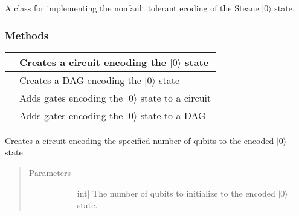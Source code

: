 \documentclass[letterpaper,10pt,english]{sphinxmanual}
\begin{document}

\begin{fulllineitems}
\label{\detokenize{Base:BaseFaultTolerance.Encoder}}
A class for implementing the non\sphinxhyphen{}fault tolerant ecoding of the Steane \(|0\rangle\) state.
\subsubsection*{Methods}


\begin{savenotes}\sphinxattablestart
\centering
\begin{tabulary}{\linewidth}[t]{|T|T|}
\hline

&
Creates a circuit encoding the \(|0\rangle\) state
\\
\hline
{}
&
Creates a DAG encoding the \(|0\rangle\) state
\\
\hline
{}
&
Adds gates encoding the \(|0\rangle\) state to a circuit
\\
\hline
{}
&
Adds gates encoding the \(|0\rangle\) state to a DAG
\\
\hline
\end{tabulary}
\par
\sphinxattableend\end{savenotes}

\begin{fulllineitems}
\label{\detokenize{Base:BaseFaultTolerance.Encoder.createEncoderCircuit}}
Creates a circuit encoding the specified number of qubits to the encoded \(|0\rangle\) state.
\begin{quote}\begin{description}
\item[{Parameters}] \leavevmode\begin{description}
\item[{}] \leavevmode{[}int{]}
The number of qubits to initialize to the encoded \(|0\rangle\) state.


\end{description}
\end{description}
\end{quote}
\end{fulllineitems}
\end{fulllineitems}
\end{document}
